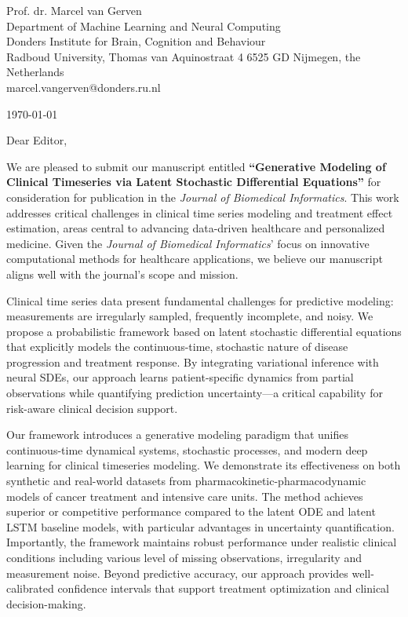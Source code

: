 \documentclass[11pt,a4paper]{article}
\begin{document}
\begin{flushleft}
Prof. dr. Marcel van Gerven \\
Department of Machine Learning and Neural Computing \\
Donders Institute for Brain, Cognition and Behaviour\\
Radboud University, Thomas van Aquinostraat 4
6525 GD Nijmegen, the Netherlands\\
marcel.vangerven@donders.ru.nl
\end{flushleft}

\vspace{1em}

\begin{flushleft}
\today
\end{flushleft}

\vspace{1em}

Dear Editor,

We are pleased to submit our manuscript entitled \textbf{``Generative Modeling of Clinical Timeseries via Latent Stochastic Differential Equations''} for consideration for publication in the \textit{Journal of Biomedical Informatics}. This work addresses critical challenges in clinical time series modeling and treatment effect estimation, areas central to advancing data-driven healthcare and personalized medicine. Given the \textit{Journal of Biomedical Informatics}' focus on innovative computational methods for healthcare applications, we believe our manuscript aligns well with the journal's scope and mission.

Clinical time series data present fundamental challenges for predictive modeling: measurements are irregularly sampled, frequently incomplete, and noisy. We propose a probabilistic framework based on latent stochastic differential equations that explicitly models the continuous-time, stochastic nature of disease progression and treatment response. By integrating variational inference with neural SDEs, our approach learns patient-specific dynamics from partial observations while quantifying prediction uncertainty---a critical capability for risk-aware clinical decision support.

Our framework introduces a generative modeling paradigm that 
unifies continuous-time dynamical systems, stochastic processes, 
and modern deep learning for clinical timeseries modeling. We demonstrate its effectiveness on both synthetic and real-world datasets from pharmacokinetic-pharmacodynamic models of cancer treatment and intensive care units. The method achieves superior or competitive performance compared to the latent ODE and latent LSTM baseline models, with particular advantages in uncertainty quantification. Importantly, the framework maintains robust performance under realistic clinical conditions including various level of missing observations, irregularity and measurement noise. Beyond predictive accuracy, our approach provides well-calibrated confidence intervals that support treatment optimization and clinical decision-making.
\end{document}
